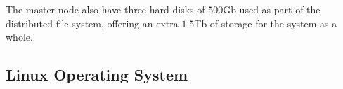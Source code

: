 \documentclass[twoside,a4paper,12pt,english]{inac19}
\begin{document}
The master node also have three hard-disks of $500$Gb used as part of the distributed file system, offering
an extra $1.5$Tb of storage for the system as a whole.





\subsection{Linux Operating System}



\end{document}
